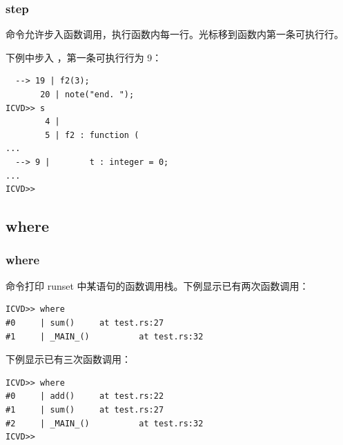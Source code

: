 \subsubsection*{step}

 命令允许步入函数调用，执行函数内每一行。光标移到函数内第一条可执行行。

下例中步入 ，第一条可执行行为 9：
\begin{lstlisting}
  --> 19 | f2(3);
       20 | note("end. ");
ICVD>> s
        4 |
        5 | f2 : function (
...
  --> 9 |        t : integer = 0;
...
ICVD>>
\end{lstlisting}

\subsection{where}
\subsubsection*{where}

 命令打印 runset 中某语句的函数调用栈。下例显示已有两次函数调用：

\begin{lstlisting}
ICVD>> where
#0     | sum()     at test.rs:27
#1     | _MAIN_()          at test.rs:32
\end{lstlisting}

下例显示已有三次函数调用：

\begin{lstlisting}
ICVD>> where
#0     | add()     at test.rs:22
#1     | sum()     at test.rs:27
#2     | _MAIN_()          at test.rs:32
ICVD>>
\end{lstlisting}
